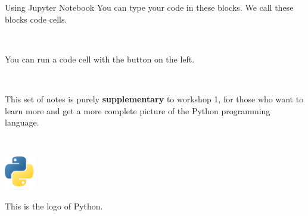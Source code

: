 \documentclass[dvipsnames, svgnames, x11names]{beamer}
\begin{document}
\begin{frame}[fragile]{Using Jupyter Notebook}
    You can type your code in these blocks. We call these blocks code cells.

    \begin{center}
    \end{center}

    \

    You can run a code cell with the button on the left.

    \begin{center}
    \end{center}
\end{frame}

\begin{frame}[fragile]{ \ }

    \begin{center}
        This set of notes is purely \textbf{supplementary} to workshop 1, for those who want to learn more and get a more complete picture of the Python programming language.
    
        \ 

        \includegraphics[width=0.1\textwidth]{Python-logo.png}

        This is the logo of Python.
    \end{center}
    
\end{frame}
\end{document}

